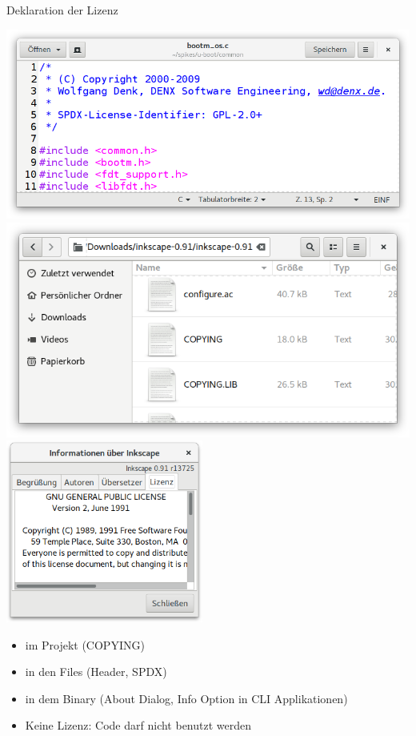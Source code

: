 \begin{frame}{Deklaration der Lizenz}
	\begin{center}
		{
			\includegraphics[width=\textwidth]{res/lizenz-source.png}
		}
		\only<3|handout:2>
		{
			\includegraphics[width=\textwidth]{res/lizenz-file.png}
		}
		\only<4|handout:3>
		{
			\includegraphics[height=6cm]{res/lizenz-binary.png}
		}
	\end{center}
\end{frame}
\note
{
	\begin{itemize}
		\item im Projekt (COPYING)
		\item in den Files (Header, SPDX)
		\item in dem Binary (About Dialog, Info Option in CLI Applikationen)
		\item Keine Lizenz: Code darf nicht benutzt werden
	\end{itemize}
}

